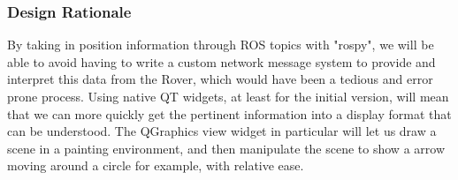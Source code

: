 \subsubsection{Design Rationale}
By taking in position information through ROS topics with "rospy", we will be able to avoid having to write a custom network message system to provide and interpret this data from the Rover, which would have been a tedious and error prone process.
Using native QT widgets, at least for the initial version, will mean that we can more quickly get the pertinent information into a display format that can be understood. 
The QGraphics view widget in particular will let us draw a scene in a painting environment, and then manipulate the scene to show a arrow moving around a circle for example, with relative ease.
